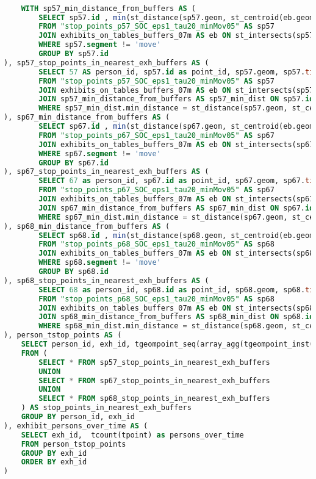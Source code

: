 \documentclass[12pt]{article}
\begin{document}
\begin{lstlisting}[language=SQL,
    deletekeywords={IDENTITY,INT},
    morekeywords={clustered},    
    framesep=10pt,
    framextopmargin=10pt]

    WITH sp57_min_distance_from_buffers AS (
		SELECT sp57.id , min(st_distance(sp57.geom, st_centroid(eb.geom))) as min_distance
		FROM "stop_points_p57_SOC_eps1_tau20_minMov05" AS sp57 
		JOIN exhibits_on_tables_buffers_07m AS eb ON st_intersects(sp57.geom, eb.geom)
		WHERE sp57.segment != 'move'
		GROUP BY sp57.id
), sp57_stop_points_in_nearest_exh_buffers AS (
		SELECT 57 AS person_id, sp57.id as point_id, sp57.geom, sp57.timestamp, eb.id as exh_id, st_distance(sp57.geom, st_centroid(eb.geom)) as distance_from_centroid
		FROM "stop_points_p57_SOC_eps1_tau20_minMov05" AS sp57 
		JOIN exhibits_on_tables_buffers_07m AS eb ON st_intersects(sp57.geom, eb.geom)
		JOIN sp57_min_distance_from_buffers AS sp57_min_dist ON sp57.id = sp57_min_dist.id
		WHERE sp57_min_dist.min_distance = st_distance(sp57.geom, st_centroid(eb.geom))
), sp67_min_distance_from_buffers AS (
		SELECT sp67.id , min(st_distance(sp67.geom, st_centroid(eb.geom))) as min_distance
		FROM "stop_points_p67_SOC_eps1_tau20_minMov05" AS sp67 
		JOIN exhibits_on_tables_buffers_07m AS eb ON st_intersects(sp67.geom, eb.geom)
		WHERE sp67.segment != 'move'
		GROUP BY sp67.id
), sp67_stop_points_in_nearest_exh_buffers AS (
		SELECT 67 as person_id, sp67.id as point_id, sp67.geom, sp67.timestamp, eb.id as exh_id, st_distance(sp67.geom, st_centroid(eb.geom)) as distance_from_centroid
		FROM "stop_points_p67_SOC_eps1_tau20_minMov05" AS sp67 
		JOIN exhibits_on_tables_buffers_07m AS eb ON st_intersects(sp67.geom, eb.geom)
		JOIN sp67_min_distance_from_buffers AS sp67_min_dist ON sp67.id = sp67_min_dist.id
		WHERE sp67_min_dist.min_distance = st_distance(sp67.geom, st_centroid(eb.geom))
), sp68_min_distance_from_buffers AS (
		SELECT sp68.id , min(st_distance(sp68.geom, st_centroid(eb.geom))) as min_distance
		FROM "stop_points_p68_SOC_eps1_tau20_minMov05" AS sp68 
		JOIN exhibits_on_tables_buffers_07m AS eb ON st_intersects(sp68.geom, eb.geom)
		WHERE sp68.segment != 'move'
		GROUP BY sp68.id
), sp68_stop_points_in_nearest_exh_buffers AS (
		SELECT 68 as person_id, sp68.id as point_id, sp68.geom, sp68.timestamp, eb.id as exh_id, st_distance(sp68.geom, st_centroid(eb.geom)) as distance_from_centroid
		FROM "stop_points_p68_SOC_eps1_tau20_minMov05" AS sp68 
		JOIN exhibits_on_tables_buffers_07m AS eb ON st_intersects(sp68.geom, eb.geom)
		JOIN sp68_min_distance_from_buffers AS sp68_min_dist ON sp68.id = sp68_min_dist.id
		WHERE sp68_min_dist.min_distance = st_distance(sp68.geom, st_centroid(eb.geom))
), person_tstop_points AS (
    SELECT person_id, exh_id, tgeompoint_seq(array_agg(tgeompoint_inst(geom, timestamp) ORDER BY timestamp)) AS tpoint
    FROM (
        SELECT * FROM sp57_stop_points_in_nearest_exh_buffers 
        UNION 
        SELECT * FROM sp67_stop_points_in_nearest_exh_buffers
        UNION
        SELECT * FROM sp68_stop_points_in_nearest_exh_buffers
    ) AS stop_points_in_nearest_exh_buffers
    GROUP BY person_id, exh_id
), exhibit_persons_over_time AS (
    SELECT exh_id,  tcount(tpoint) as persons_over_time
    FROM person_tstop_points
    GROUP BY exh_id
    ORDER BY exh_id
)


\end{lstlisting}
\end{document}
